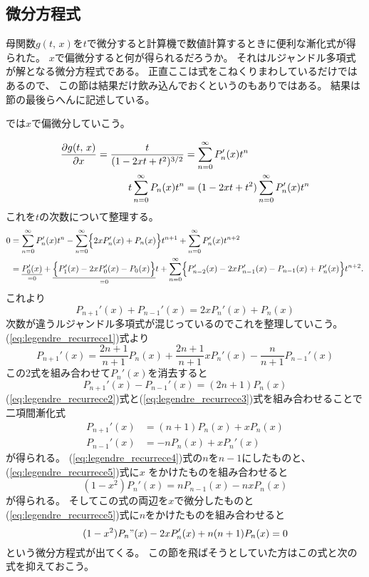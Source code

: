 \documentclass[../../master.tex]{subfiles}
\begin{document}
\subsection{微分方程式}
母関数\(g(t,\,x)\)を\(t\)で微分すると計算機で数値計算するときに便利な漸化式が得られた。
\(x\)で偏微分すると何が得られるだろうか。
それはルジャンドル多項式が解となる微分方程式である。
正直ここは式をこねくりまわしているだけではあるので、
この節は結果だけ飲み込んでおくというのもありではある。
結果は節の最後らへんに記述している。

では\(x\)で偏微分していこう。

\begin{align}
	\pdv{g(t,\,x)}{x} = \frac{t}{(1-2xt+t^2)^{3/2}} & = \sum_{n=0}^{\infty} P_n'(x) t^n            \\
	t\sum_{n=0}^{\infty} P_n(x) t^n                 & = (1-2xt+t^2)\sum_{n=0}^{\infty} P_n'(x) t^n
\end{align}
これを\(t\)の次数について整理する。
\begin{align}
	0 & = \sum_{n=0}^{\infty} P_n'(x)t^n - \sum_{n=0}^{\infty} \Bigl\{2xP_n'(x)+P_n(x)\Bigr\}t^{n+1} + \sum_{n=0}^{\infty}P_n'(x) t^{n+2} \\
	  & = \underset{=0}{\underline{P_0'(x)}}
	+\underset{=0}{\underline{\Bigl\{P_1'(x)-2xP_0'(x)-P_0(x)\Bigr\}}}t
	+\sum_{n=0}^{\infty}\Bigl\{P_{n-2}'(x)-2xP_{n-1}'(x)-P_{n-1}(x) +P_n'(x) \Bigr\}t^{n+2}.
\end{align}
これより
\begin{equation}
	P_{n+1}'(x)+P_{n-1}'(x) = 2xP_n'(x) + P_n(x) \label{eq:legendre_recurrece2}
\end{equation}
次数が違うルジャンドル多項式が混じっているのでこれを整理していこう。
(\ref{eq:legendre_recurrece1})式より
\begin{equation}
	P_{n+1}'(x) = \frac{2n+1}{n+1}P_n(x)+\frac{2n+1}{n+1}xP_n'(x) - \frac{n}{n+1}P_{n-1}'(x)
\end{equation}
この2式を組み合わせて\(P_n'(x)\)を消去すると
\begin{equation}
	P_{n+1}'(x)-P_{n-1}'(x) = (2n+1) P_n(x) \label{eq:legendre_recurrece3}
\end{equation}
(\ref{eq:legendre_recurrece2})式と(\ref{eq:legendre_recurrece3})式を組み合わせることで
二項間漸化式
\begin{align}
	P_{n+1}'(x) & = (n+1)P_n(x) + xP_n(x)\label{eq:legendre_recurrece4} \\
	P_{n-1}'(x) & = -nP_n(x)+xP_n'(x)\label{eq:legendre_recurrece5}
\end{align}
が得られる。
(\ref{eq:legendre_recurrece4})式の\(n\)を\(n-1\)にしたものと、
(\ref{eq:legendre_recurrece5})式に\(x\) をかけたものを組み合わせると
\begin{equation}
	(1-x^2)P_n'(x)= nP_{n-1}(x)-nxP_n(x)
\end{equation}
が得られる。
そしてこの式の両辺を\(x\)で微分したものと
(\ref{eq:legendre_recurrece5})式に\(n\)をかけたものを組み合わせると
\begin{equation}
	(1-x^2)P_n"(x)-2xP_n'(x)+n(n+1)P_n(x) = 0 \label{eq:legendre_dif_eq1}
\end{equation}
という微分方程式が出てくる。
この節を飛ばそうとしていた方はこの式と次の式を抑えておこう。
\end{document}

